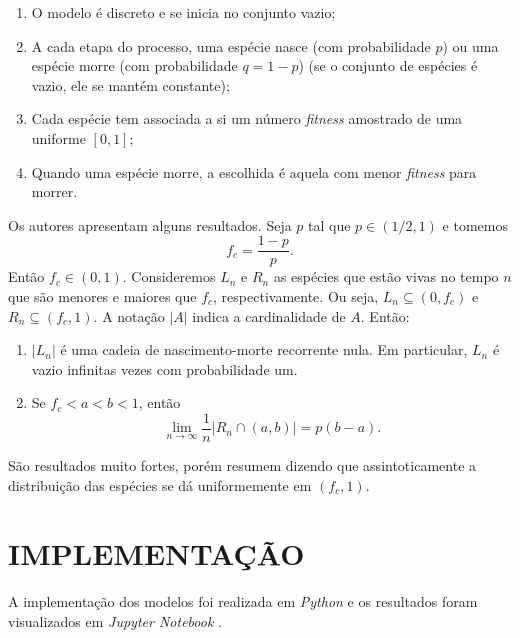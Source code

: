 \documentclass[10pt,brazil,english]{article}
\begin{document}
        \renewcommand{\theenumi}{\roman{enumi}} 
        \begin{enumerate}
            \item O modelo é discreto e se inicia no conjunto vazio;
            \item A cada etapa do processo, uma espécie nasce (com probabilidade $p$) ou uma espécie morre (com probabilidade $q = 1 - p$) (se o conjunto de espécies é vazio, ele se mantém constante);
            \item Cada espécie tem associada a si um número \textit{fitness} amostrado de uma uniforme $[0, 1]$;
            \item Quando uma espécie morre, a escolhida é aquela com menor \textit{fitness} para morrer.
        \end{enumerate}

        Os autores apresentam alguns resultados. Seja $p$ tal que $p \in (1/2, 1)$ e tomemos $$f_c = \frac{1 - p}{p}\textrm{.}$$
        Então $f_c \in (0, 1)$.
        Consideremos $L_n$ e $R_n$ as espécies que estão vivas no tempo $n$ que são menores e maiores que $f_c$, respectivamente. Ou seja, $L_n \subseteq (0, f_c)$ e $R_n \subseteq (f_c, 1)$. A notação $|A|$ indica a cardinalidade de $A$. Então:

        \begin{theorem} \cite{guiol2009stochastic}
            \label{theorem1}
            \renewcommand{\theenumi}{\alph{enumi}} 
            \begin{enumerate}
                \item $|L_n|$ é uma cadeia de nascimento-morte recorrente nula. Em particular, $L_n$ é vazio infinitas vezes com probabilidade um.
                \item Se $f_c < a < b < 1$, então $$\lim_{n \to \infty} \dfrac{1}{n} |R_n \cap (a, b)| = p(b - a) \textrm{.}$$
            \end{enumerate}
        \end{theorem}

        São resultados muito fortes, porém  resumem dizendo que assintoticamente a distribuição das espécies se dá uniformemente em $(f_c, 1)$.

    \section{\uppercase{Implementação}}

        A implementação dos modelos foi realizada em \textit{Python} e os resultados foram visualizados em \textit{Jupyter Notebook} \cite{domingues2019github}.
\end{document}

